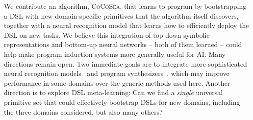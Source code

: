 \documentclass{article}
\newcommand{\systemEnding}{\textsc{CoCoSea}}
\begin{document}
We contribute an algorithm, \systemEnding, that learns to program by bootstrapping a DSL with new
domain-specific primitives that the algorithm itself discovers,
together with a neural recognition model that learns how to
efficiently deploy the DSL on new tasks. We believe this integration
of top-down symbolic representations and bottom-up neural networks --
both of them learned -- could help make program induction systems more
generally useful for AI. Many directions remain open. Two immediate
goals 
are to integrate more sophisticated neural recognition
models~\cite{devlin2017robustfill} and program
synthesizers~\cite{solar2008program}, which may improve performance in
some domains over the generic methods used here.
Another direction is to
explore DSL meta-learning: Can we find a \emph{single} universal
primitive set that could effectively bootstrap DSLs for new domains,
including the three domains considered,  but also many others?


{\small }
\end{document}
